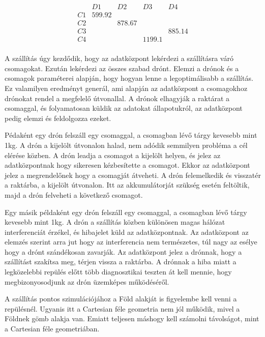 \[
    \begin{matrix}
        & D1 & D2 & D3 & D4 \\
        C1 & 599.92 &  &  &  \\
        C2 &  & 878.67 & & \\
        C3 &  &  &  & 885.14 \\
        C4 &  &  & 1199.1 &  \\
    \end{matrix}
\]



A szállítás úgy kezdődik, hogy az adatközpont lekérdezi a szállításra váró csomagokat. Ezután lekérdezi az összes szabad drónt.
Elemzi a drónok és a csomagok paraméterei alapján, hogy hogyan lenne a legoptimálisabb a szállítás. Ez valamilyen eredményt generál, ami
alapján az adatközpont a csomagokhoz drónokat rendel a megfelelő útvonallal. A drónok elhagyják a raktárat a csomaggal, és folyamatosan küldik az adatokat állapotukról,
az adatközpont pedig elemzi és feldolgozza ezeket.

Pédaként egy drón felszáll egy csomaggal, a csomagban lévő tárgy kevesebb mint 1kg. A drón a kijelölt útvonalon halad, nem adódik semmilyen probléma a cél
elérése közben. A drón leadja a csomagot a kijelölt helyen, és jelez az adatközpontnak hogy sikeresen kézbesítette a csomagot.
Ekkor az adatközpont jelez a megrendelőnek hogy a csomagját átveheti. A drón felemelkedik és visszatér a raktárba, a kijelölt útvonalon. Itt az akkumulátorját szükség esetén
feltöltik, majd a drón felveheti a következő csomagot.

Egy másik példaként egy drón felszáll egy csomaggal, a csomagban lévő tárgy kevesebb mint 1kg. A drón a szállítás közben különösen magas hálózat interferenciát érzékel,
és hibajelet küld az adatközpontnak. Az adatközpont az elemzés szerint arra jut hogy az interferencia nem természetes,
túl nagy az esélye hogy a drónt szándékosan zavarják. Az adatközpont jelez a drónnak, hogy a szállítást szakítsa meg, térjen vissza a raktárba.
A drónnak a hiba miatt a legközelebbi repülés előtt több diagnosztikai teszten át kell mennie, hogy megbizonyosodjunk az drón üzemképes működéséről.


A szállítás pontos szimulációjához a Föld alakját is figyelembe kell venni a repülésnél.
Ugyanis itt a Cartesian féle geometria nem jól működik, mivel a Földnek gömb alakja van.
Emiatt teljesen máshogy kell számolni távolságot, mint a Cartesian féle geometriában.
